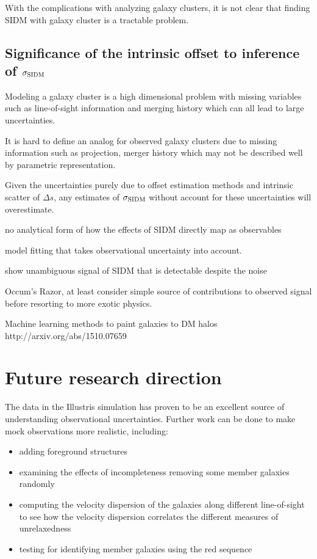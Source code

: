 With the complications with analyzing galaxy clusters, 
it is not clear that finding SIDM with galaxy cluster is a tractable problem. 


\subsection{Significance of the intrinsic offset to inference of $\sigma_{\rm
SIDM}$}
Modeling a galaxy cluster is a high dimensional problem with missing
variables such as line-of-sight information and merging history which can all 
lead to large uncertainties.

It is hard to define an analog for observed galaxy clusters due to missing
information such as projection, merger history which may not be described well
by parametric representation.

Given the uncertainties purely due to offset estimation methods and 
intrinsic scatter of $\Delta s$, any estimates of $\sigma_{\rm SIDM}$ without
account for these uncertainties will overestimate. 

  


no analytical form of how the effects of SIDM directly map as observables  
 
model fitting that takes  observational uncertainty into account. 

show unambiguous signal of SIDM that is detectable despite the noise 

Occum's Razor, at least consider simple source of contributions to observed signal 
before resorting to more exotic physics.

Machine learning methods to paint galaxies to DM halos 
http://arxiv.org/abs/1510.07659


\section{Future research direction}
The data in the Illustris simulation has proven to be an excellent source of
understanding observational uncertainties.
Further work can be done to make mock observations more realistic, including:
\begin{itemize}
		\item adding foreground structures 
		\item examining the effects of incompleteness removing some member galaxies randomly 
		\item computing the velocity dispersion of the galaxies along different
			line-of-sight to see how the velocity dispersion correlates the different
			measures of unrelaxedness
		\item testing for identifying member galaxies using the red sequence
	\end{itemize}


